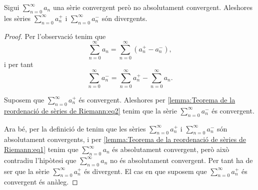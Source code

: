 \documentclass[../Apunts.tex]{subfiles}
\begin{document}
	\begin{lemma}
		\label{lemma:Teorema de la reordenació de sèries de Riemann}
		Sigui \(\sum_{n=0}^{\infty}a_{n}\) una sèrie convergent però no absolutament convergent. Aleshores les sèries \(\sum_{n=0}^{\infty}a^{+}_{n}\) i \(\sum_{n=0}^{\infty}a^{-}_{n}\) són divergents.
		\begin{proof}
			Per l'observació  tenim que
			\begin{equation}
				\label{lemma:Teorema de la reordenació de sèries de Riemann:eq1}
				\sum_{n=0}^{\infty}a_{n}=\sum_{n=0}^{\infty}\left(a^{+}_{n}-a^{-}_{n}\right),
			\end{equation}
			i per tant
			\begin{equation}
				\label{lemma:Teorema de la reordenació de sèries de Riemann:eq2}
				\sum_{n=0}^{\infty}a^{-}_{n}=\sum_{n=0}^{\infty}a^{+}_{n}-\sum_{n=0}^{\infty}a_{n}.
			\end{equation}
			
			Suposem que \(\sum_{n=0}^{\infty}a^{+}_{n}\) és convergent. Aleshores per \eqref{lemma:Teorema de la reordenació de sèries de Riemann:eq2} tenim que la sèrie \(\sum_{n=0}^{\infty}a^{-}_{n}\) és convergent.
			
			Ara bé, per la definició de  tenim que les sèries \(\sum_{n=0}^{\infty}a^{+}_{n}\) i \(\sum_{n=0}^{\infty}a^{-}_{n}\) són absolutament convergents, i per \eqref{lemma:Teorema de la reordenació de sèries de Riemann:eq1} tenim que \(\sum_{n=0}^{\infty}a_{n}\) és absolutament convergent, però això contradiu l'hipòtesi que \(\sum_{n=0}^{\infty}a_{n}\) no és absolutament convergent. Per tant ha de ser que la sèrie \(\sum_{n=0}^{\infty}a^{+}_{n}\) és divergent. El cas en que suposem que \(\sum_{n=0}^{\infty}a^{+}_{n}\) és convergent és anàleg.
		\end{proof}
	\end{lemma}
\end{document}
